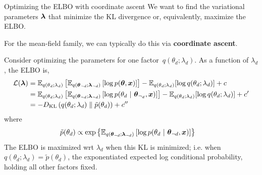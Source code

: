 \documentclass[aspectratio=169]{beamer}
\begin{document}
\begin{frame}{Optimizing the ELBO with coordinate ascent}
    We want to find the variational parameters $\boldsymbol{\lambda}$ that minimize the KL divergence or, equivalently, maximize the ELBO.
    
    For the mean-field family, we can typically do this via \textbf{coordinate ascent}. 
    
    Consider optimizing the parameters for one factor~$q(\theta_d; \lambda_d)$. As a function of $\lambda_d$, the ELBO is,
    \begin{align*}
        \mathcal{L}(\boldsymbol{\lambda}) 
        &= 
        \mathbb{E}_{q(\theta_d; \lambda_d)}\left[ \mathbb{E}_{q(\boldsymbol{\theta}_{\neg d}; \boldsymbol{\lambda}_{\neg d})} \left[ \log p(\boldsymbol{\theta}, \boldsymbol{x}) \right] \right] -
        \mathbb{E}_{q(\theta_d; \lambda_d)}[\log q(\theta_d; \lambda_d)] + c \\
        &= 
        \mathbb{E}_{q(\theta_d; \lambda_d)}\left[ \mathbb{E}_{q(\boldsymbol{\theta}_{\neg d}; \boldsymbol{\lambda}_{\neg d})} \left[ \log p(\theta_d ~\vert~ \boldsymbol{\theta}_{\neg_d}, \boldsymbol{x}) \right] \right] -
        \mathbb{E}_{q(\theta_d; \lambda_d)}[\log q(\theta_d; \lambda_d)] + c' \\
        &= -D_{\textrm{KL}}\left(q(\theta_d; \lambda_d)\;\|\;\tilde{p}(\theta_d)\right) + c''
    \end{align*}
    where 
    \begin{align*}
        \label{eq:cavi_form}
        \tilde{p}(\theta_d) &\propto
        \exp \left\{ \mathbb{E}_{q(\boldsymbol{\theta}_{\neg d}; \boldsymbol{\lambda}_{\neg d})} \left[ \log p(\theta_d ~\vert~ \boldsymbol{\theta}_{\neg d}, \boldsymbol{x}) \right] \right\}
    \end{align*}
    The ELBO is maximized wrt $\lambda_d$ when this KL is minimized; i.e. when $q(\theta_d ; \lambda_d) = \tilde{p}(\theta_d)$, the exponentiated expected log conditional probability, holding all other factors fixed.
\end{frame}




    
    
    
\end{document}
